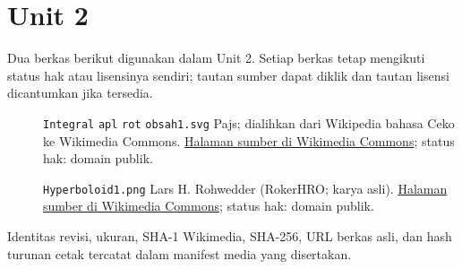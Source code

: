 \section*{Unit 2}
Dua berkas berikut digunakan dalam Unit 2. Setiap berkas tetap mengikuti status hak atau lisensinya sendiri; tautan sumber dapat diklik dan tautan lisensi dicantumkan jika tersedia.
\begin{description}
\item[]\texttt{Integral} \texttt{apl} \texttt{rot} \texttt{obsah1.svg}
Pajs; dialihkan dari Wikipedia bahasa Ceko ke Wikimedia Commons.
\href{https://commons.wikimedia.org/wiki/File:Integral_apl_rot_obsah1.svg}{Halaman sumber di Wikimedia Commons}; status hak: domain publik.
\item[]\texttt{Hyperboloid1.png}
Lars H. Rohwedder (RokerHRO; karya asli).
\href{https://commons.wikimedia.org/wiki/File:Hyperboloid1.png}{Halaman sumber di Wikimedia Commons}; status hak: domain publik.
\end{description}
Identitas revisi, ukuran, SHA-1 Wikimedia, SHA-256, URL berkas asli, dan hash turunan cetak tercatat dalam manifest media yang disertakan.
